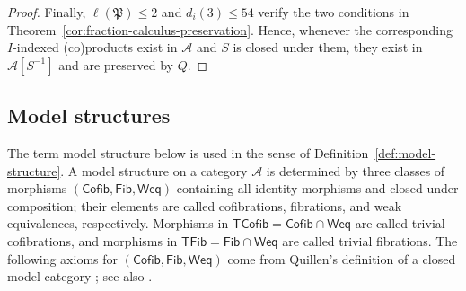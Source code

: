 \documentclass[10pt,a4paper]{amsart}
\theoremstyle{plain}
\theoremstyle{definition}
\theoremstyle{remark}
\begin{document}
\begin{proof}
  \medskip

  Finally, $\ell(\mathfrak P)\leq2$ and $d_i(3)\leq54$ verify the two conditions in Theorem~\ref{cor:fraction-calculus-preservation}.
  Hence, whenever the corresponding $I$-indexed (co)products exist in $\mathcal A$ and $S$ is closed under them, they exist in $\mathcal A[S^{-1}]$ and are preserved by $Q$.
\end{proof}

\subsection{Model structures}

The term model structure below is used in the sense of Definition~\ref{def:model-structure}.
A model structure on a category $\mathcal A$ is determined by three classes of morphisms $(\mathsf{Cofib},\mathsf{Fib},\mathsf{Weq})$ containing all identity morphisms and closed under composition; their elements are called cofibrations, fibrations, and weak equivalences, respectively.
Morphisms in $\mathsf{TCofib} = \mathsf{Cofib}\cap\mathsf{Weq}$ are called trivial cofibrations, and morphisms in $\mathsf{TFib} = \mathsf{Fib}\cap\mathsf{Weq}$ are called trivial fibrations.
The following axioms for $(\mathsf{Cofib}, \mathsf{Fib}, \mathsf{Weq})$ come from Quillen's definition of a closed model category \cite[Chapter~I, \S~1]{Quillen}; see also \cite[Section~3, Definition~3.3]{DwyerSpalinski}.
\end{document}
